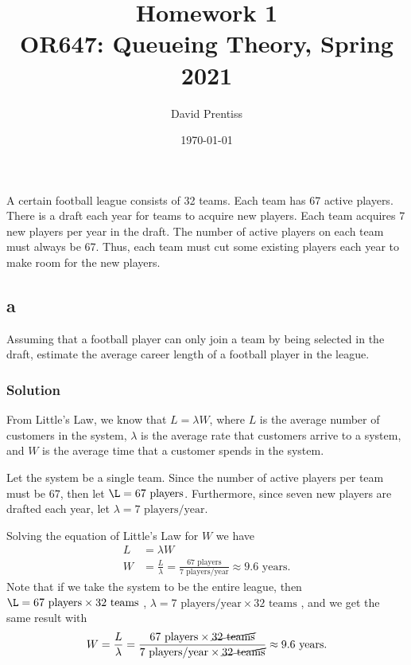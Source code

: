 \documentclass[letterpaper]{amsart}
\title[Homework 1]{Homework 1 \\ OR647: Queueing Theory, Spring 2021}
\author{David Prentiss}
\date{\today}
\begin{document}
\maketitle

\section{} %
A certain football league consists of 32 teams. Each team has 67 active
players. There is a draft each year for teams to acquire new players. Each
team acquires 7 new players per year in the draft. The number of active
players on each team must always be 67. Thus, each team must cut some
existing players each year to make room for the new players.

\subsection*{a}
Assuming that a football player can only join a team by being selected
in the draft, estimate the average career length of a football player in
the league.


\subsubsection*{Solution}

From Little's Law, we know that $L=\lambda W$, where $L$ is the average number
of customers in the system, $\lambda$ is the average rate that customers arrive
to a system, and $W$ is the average time that a customer spends in the system.

Let the system be a single team. Since the number of active
players per team must be 67, then let $\L = 67 \text{ players}$. Furthermore, since seven
new players are drafted each year, let $\lambda = 7 \text{ players/year}$.

Solving the equation of Little's Law for $W$ we have
\begin{align}
  L &= \lambda W \\
  W &= \frac{L}{\lambda} = \frac{67 \text{ players}}{7 \text{ players/year}} \approx 9.6 \text{ years}.
\end{align}
Note that if we take the system to be the entire league, then
$\L = 67 \text{ players} \times 32 \text{ teams}$
,
$\lambda = 7 \text{ players/year}\times 32 \text{ teams}$
, and we get the same result with
\begin{equation}
  W = \frac{L}{\lambda} = \frac{67 \text{ players} \times \cancel{32 \text{ teams}}}
  {7 \text{ players/year}\times \cancel{32 \text{ teams}}} \approx 9.6 \text{ years}.
\end{equation}
\end{document}
